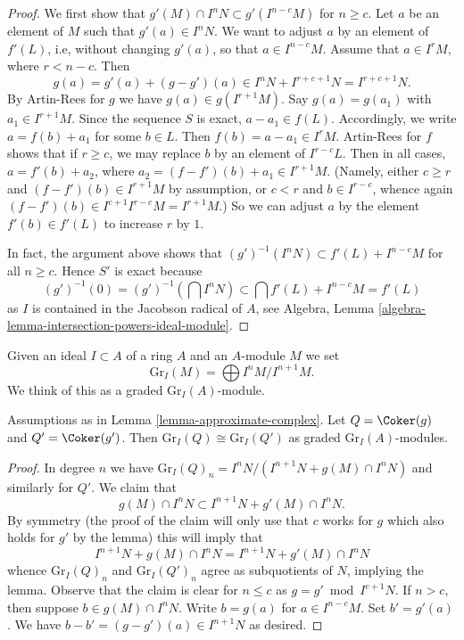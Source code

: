 \begin{proof}
We first show that $g'(M) \cap I^nN \subset g'(I^{n - c}M)$ for $n \geq c$.
Let $a$ be an element of $M$ such that $g'(a) \in I^nN$. We want to
adjust $a$ by an element of $f'(L)$, i.e, without changing $g'(a)$, so
that $a \in I^{n-c}M$. Assume that $a \in I^rM$, where $r < n - c$.
Then
$$
g(a) = g'(a) + (g - g')(a) \in
I^n N + I^{r + c + 1}N = I^{r + c + 1}N.
$$
By Artin-Rees for $g$ we have $g(a) \in g(I^{r + 1}M)$. Say $g(a) = g(a_1)$
with $a_1 \in I^{r + 1}M$. Since the sequence $S$ is exact, $a - a_1 \in f(L)$.
Accordingly, we write $a = f(b) + a_1$ for some $b \in L$.
Then $f(b) = a - a_1 \in I^rM$. Artin-Rees for $f$ shows that
if $r \geq c$, we may replace $b$ by an element of $I^{r - c}L$.
Then in all cases, $a = f'(b) + a_2$, where
$a_2 = (f - f')(b) + a_1 \in I^{r + 1}M$. (Namely, either $c \geq r$
and $(f - f')(b) \in I^{r + 1}M$ by assumption, or $c < r$ and
$b \in I^{r - c}$, whence again $(f - f')(b) \in I^{c + 1} I^{r - c} M =
I^{r + 1}M$.) So we can adjust $a$ by the element $f'(b) \in f'(L)$ to
increase $r$ by $1$.

\medskip\noindent
In fact, the argument above shows that
$(g')^{-1}(I^nN) \subset f'(L) + I^{n - c}M$ for all $n \geq c$.
Hence $S'$ is exact because
$$
(g')^{-1}(0) = (g')^{-1}(\bigcap I^nN) \subset
\bigcap f'(L) + I^{n - c}M = f'(L)
$$
as $I$ is contained in the Jacobson radical of $A$, see Algebra, Lemma
\ref{algebra-lemma-intersection-powers-ideal-module}.
\end{proof}

\noindent
Given an ideal $I \subset A$ of a ring $A$ and an $A$-module $M$
we set
$$
\text{Gr}_I(M) = \bigoplus I^nM/I^{n + 1}M.
$$
We think of this as a graded $\text{Gr}_I(A)$-module.

\begin{lemma}
\label{lemma-approximate-complex-graded}
Assumptions as in Lemma \ref{lemma-approximate-complex}.
Let $Q = \Coker(g)$ and $Q' = \Coker(g')$. Then
$\text{Gr}_I(Q) \cong \text{Gr}_I(Q')$
as graded $\text{Gr}_I(A)$-modules.
\end{lemma}

\begin{proof}
In degree $n$ we have
$\text{Gr}_I(Q)_n = I^nN/(I^{n + 1}N + g(M) \cap I^nN)$
and similarly for $Q'$. We claim that
$$
g(M) \cap I^nN \subset I^{n + 1}N + g'(M) \cap I^nN.
$$
By symmetry (the proof of the claim will only use that $c$ works
for $g$ which also holds for $g'$ by the lemma) this will imply that
$$
I^{n + 1}N + g(M) \cap I^nN = I^{n + 1}N + g'(M) \cap I^nN
$$
whence $\text{Gr}_I(Q)_n$ and $\text{Gr}_I(Q')_n$ agree as subquotients
of $N$, implying the lemma. Observe that the claim is clear for
$n \leq c$ as $g = g' \bmod I^{c + 1}N$. If $n > c$, then suppose
$b \in g(M) \cap I^nN$. Write $b = g(a)$ for $a \in I^{n - c}M$.
Set $b' = g'(a)$. We have $b - b' = (g - g')(a) \in I^{n + 1}N$
as desired.
\end{proof}

